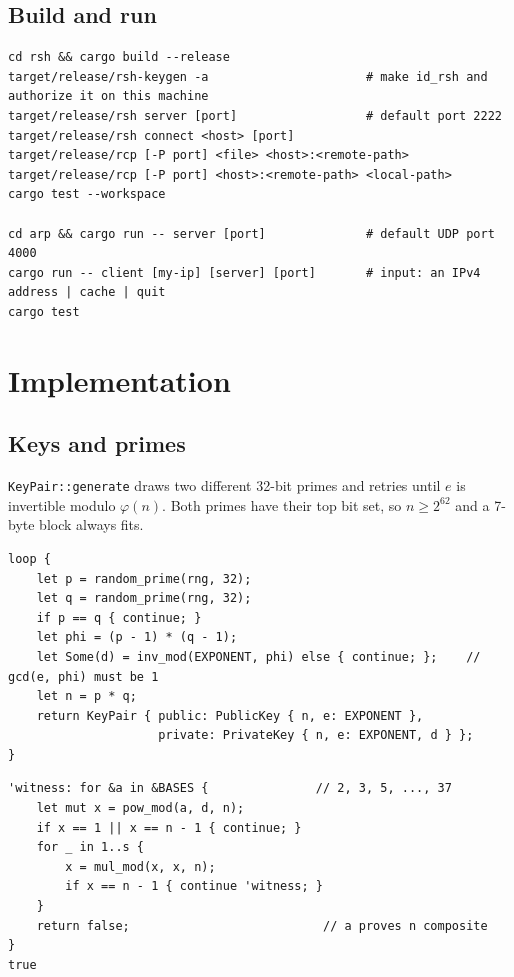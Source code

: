 \documentclass[11pt,a4paper]{article}
\begin{document}
\subsection{Build and run}

\begin{lstlisting}[style=plain]
cd rsh && cargo build --release
target/release/rsh-keygen -a                      # make id_rsh and authorize it on this machine
target/release/rsh server [port]                  # default port 2222
target/release/rsh connect <host> [port]
target/release/rcp [-P port] <file> <host>:<remote-path>
target/release/rcp [-P port] <host>:<remote-path> <local-path>
cargo test --workspace

cd arp && cargo run -- server [port]              # default UDP port 4000
cargo run -- client [my-ip] [server] [port]       # input: an IPv4 address | cache | quit
cargo test
\end{lstlisting}



\section{Implementation}

\subsection{Keys and primes}

\texttt{KeyPair::generate} draws two different 32-bit primes and retries until
$e$ is invertible modulo $\varphi(n)$. Both primes have their top bit set, so
$n \geq 2^{62}$ and a 7-byte block always fits.

\begin{lstlisting}[caption={Key generation in \texttt{KeyPair::generate} (\texttt{rsa.rs}).}]
loop {
    let p = random_prime(rng, 32);
    let q = random_prime(rng, 32);
    if p == q { continue; }
    let phi = (p - 1) * (q - 1);
    let Some(d) = inv_mod(EXPONENT, phi) else { continue; };    // gcd(e, phi) must be 1
    let n = p * q;
    return KeyPair { public: PublicKey { n, e: EXPONENT },
                     private: PrivateKey { n, e: EXPONENT, d } };
}
\end{lstlisting}

\begin{lstlisting}[caption={Miller--Rabin witness loop in \texttt{is\_prime} (\texttt{prime.rs}); $n-1 = 2^{s}d$.}]
'witness: for &a in &BASES {               // 2, 3, 5, ..., 37
    let mut x = pow_mod(a, d, n);
    if x == 1 || x == n - 1 { continue; }
    for _ in 1..s {
        x = mul_mod(x, x, n);
        if x == n - 1 { continue 'witness; }
    }
    return false;                           // a proves n composite
}
true
\end{lstlisting}
\end{document}

